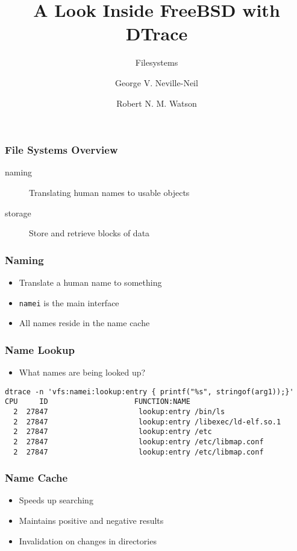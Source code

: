 \documentclass[pdftex]{beamer}
\begin{document}

\title{A Look Inside FreeBSD with DTrace}
\subtitle{Filesystems}
\author[shortname]{George V. Neville-Neil \and Robert N. M. Watson}

\begin{frame}
  \frametitle{File Systems Overview}
  \begin{description}
  \item[naming] Translating human names to usable objects
  \item[storage] Store and retrieve blocks of data
  \end{description}
\end{frame}

\begin{frame}[fragile]
  \frametitle{Naming}
  \begin{itemize}
  \item Translate a human name to something
  \item \verb+namei+ is the main interface
  \item All names reside in the name cache
  \end{itemize}
\end{frame}

\begin{frame}[fragile]
  \frametitle{Name Lookup}
  \begin{itemize}
  \item What names are being looked up?
  \end{itemize}
\begin{lstlisting}
dtrace -n 'vfs:namei:lookup:entry { printf("%s", stringof(arg1));}'
CPU     ID                    FUNCTION:NAME
  2  27847                     lookup:entry /bin/ls
  2  27847                     lookup:entry /libexec/ld-elf.so.1
  2  27847                     lookup:entry /etc
  2  27847                     lookup:entry /etc/libmap.conf
  2  27847                     lookup:entry /etc/libmap.conf
\end{lstlisting}
\end{frame}

\begin{frame}
  \frametitle{Name Cache}
  \begin{itemize}
  \item Speeds up searching
  \item Maintains positive and negative results
  \item Invalidation on changes in directories
  \end{itemize}
\end{frame}
\end{document}
